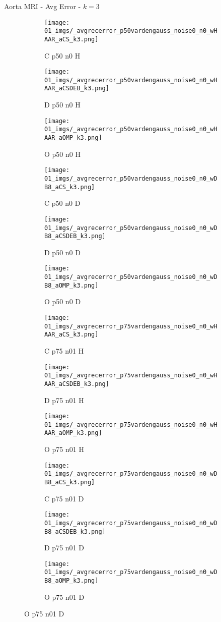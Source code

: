 \begin{frame}{Aorta MRI - Avg Error - $k=3$}{}
\begin{figure}
\begin{subfigure}{0.13\textwidth}
\texttt{[image: 01\_imgs/\_avgrecerror\_p50vardengauss\_noise0\_n0\_wHAAR\_aCS\_k3.png]}
\caption*{\tiny C p50 n0 H}
\end{subfigure}
\begin{subfigure}{0.13\textwidth}
\texttt{[image: 01\_imgs/\_avgrecerror\_p50vardengauss\_noise0\_n0\_wHAAR\_aCSDEB\_k3.png]}
\caption*{\tiny D p50 n0 H}
\end{subfigure}
\begin{subfigure}{0.13\textwidth}
\texttt{[image: 01\_imgs/\_avgrecerror\_p50vardengauss\_noise0\_n0\_wHAAR\_aOMP\_k3.png]}
\caption*{\tiny O p50 n0 H}
\end{subfigure}
\begin{subfigure}{0.13\textwidth}
\texttt{[image: 01\_imgs/\_avgrecerror\_p50vardengauss\_noise0\_n0\_wDB8\_aCS\_k3.png]}
\caption*{\tiny C p50 n0 D}
\end{subfigure}
\begin{subfigure}{0.13\textwidth}
\texttt{[image: 01\_imgs/\_avgrecerror\_p50vardengauss\_noise0\_n0\_wDB8\_aCSDEB\_k3.png]}
\caption*{\tiny D p50 n0 D}
\end{subfigure}
\begin{subfigure}{0.13\textwidth}
\texttt{[image: 01\_imgs/\_avgrecerror\_p50vardengauss\_noise0\_n0\_wDB8\_aOMP\_k3.png]}
\caption*{\tiny O p50 n0 D}
\end{subfigure}

\vspace{5pt}

\begin{subfigure}{0.13\textwidth}
\texttt{[image: 01\_imgs/\_avgrecerror\_p75vardengauss\_noise0\_n0\_wHAAR\_aCS\_k3.png]}
\caption*{\tiny C p75 n01 H}
\end{subfigure}
\begin{subfigure}{0.13\textwidth}
\texttt{[image: 01\_imgs/\_avgrecerror\_p75vardengauss\_noise0\_n0\_wHAAR\_aCSDEB\_k3.png]}
\caption*{\tiny D p75 n01 H}
\end{subfigure}
\begin{subfigure}{0.13\textwidth}
\texttt{[image: 01\_imgs/\_avgrecerror\_p75vardengauss\_noise0\_n0\_wHAAR\_aOMP\_k3.png]}
\caption*{\tiny O p75 n01 H}
\end{subfigure}
\begin{subfigure}{0.13\textwidth}
\texttt{[image: 01\_imgs/\_avgrecerror\_p75vardengauss\_noise0\_n0\_wDB8\_aCS\_k3.png]}
\caption*{\tiny C p75 n01 D}
\end{subfigure}
\begin{subfigure}{0.13\textwidth}
\texttt{[image: 01\_imgs/\_avgrecerror\_p75vardengauss\_noise0\_n0\_wDB8\_aCSDEB\_k3.png]}
\caption*{\tiny D p75 n01 D}
\end{subfigure}
\begin{subfigure}{0.13\textwidth}
\texttt{[image: 01\_imgs/\_avgrecerror\_p75vardengauss\_noise0\_n0\_wDB8\_aOMP\_k3.png]}
\caption*{\tiny O p75 n01 D}
\end{subfigure}


\end{figure}
\end{frame}
